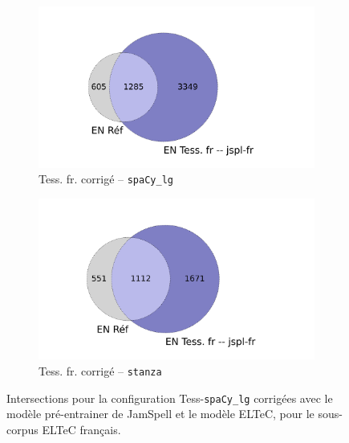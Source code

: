 \begin{figure}[h!]
\begin{minipage}{7cm}
\begin{subfigure}{1\textwidth}
  \includegraphics[width=1\textwidth]{IMAGES/INTERSECTIONS_GLOBALES/ELTeCFRA_Tess. fr -- jspl-fr_spacy-lg-concat_intersection.png} 
  \caption{Tess. fr. corrigé -- \texttt{spaCy\_lg}}
  \label{fig:ELTeCFRA_Tess. fr -- jspl-fr_spacy-lg-concat_intersection}
  \end{subfigure}
  \end{minipage}
  \begin{minipage}{7cm}
  \begin{subfigure}{1\textwidth}
  \includegraphics[width=1\textwidth]{IMAGES/INTERSECTIONS_GLOBALES/ELTeCFRA_Tess. fr -- jspl-fr_stanza-concat_intersection.png}
  \caption{Tess. fr. corrigé -- \texttt{stanza}}
  \label{fig:ELTeCFRA_Tess. fr -- jspl-fr_stanza-concat_intersection}
  \end{subfigure}
    \end{minipage}
\caption{Intersections pour la configuration Tess-\texttt{spaCy\_lg} corrigées avec le modèle pré-entrainer de JamSpell et le modèle ELTeC, pour le sous-corpus ELTeC français.}
\label{fig:intersection-globale-tess}
\end{figure}

